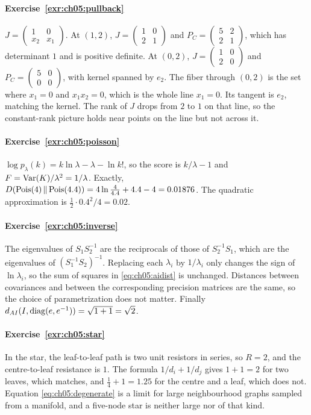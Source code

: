 \paragraph{Exercise~\ref{exr:ch05:pullback}}
$J=\begin{pmatrix}1&0\\x_2&x_1\end{pmatrix}$. At $(1,2)$, $J=\begin{pmatrix}1&0\\2&1\end{pmatrix}$ and $P_C=\begin{pmatrix}5&2\\2&1\end{pmatrix}$, which has determinant $1$ and is positive definite. At $(0,2)$, $J=\begin{pmatrix}1&0\\2&0\end{pmatrix}$ and $P_C=\begin{pmatrix}5&0\\0&0\end{pmatrix}$, with kernel spanned by $e_2$. The fiber through $(0,2)$ is the set where $x_1=0$ and $x_1x_2=0$, which is the whole line $x_1=0$. Its tangent is $e_2$, matching the kernel. The rank of $J$ drops from $2$ to $1$ on that line, so the constant-rank picture holds near points on the line but not across it.

\paragraph{Exercise~\ref{exr:ch05:poisson}}
$\log p_\lambda(k)=k\ln\lambda-\lambda-\ln k!$, so the score is $k/\lambda-1$ and $F=\operatorname{Var}(K)/\lambda^2=1/\lambda$. Exactly, $D\!\left(\mathrm{Pois}(4)\,\middle\|\,\mathrm{Pois}(4.4)\right)=4\ln\frac{4}{4.4}+4.4-4=0.01876$. The quadratic approximation is $\tfrac12\cdot0.4^2/4=0.02$.

\paragraph{Exercise~\ref{exr:ch05:inverse}}
The eigenvalues of $S_1S_2^{-1}$ are the reciprocals of those of $S_2^{-1}S_1$, which are the eigenvalues of $(S_1^{-1}S_2)^{-1}$. Replacing each $\lambda_i$ by $1/\lambda_i$ only changes the sign of $\ln\lambda_i$, so the sum of squares in \eqref{eq:ch05:aidist} is unchanged. Distances between covariances and between the corresponding precision matrices are the same, so the choice of parametrization does not matter. Finally $d_{AI}(I,\operatorname{diag}(e,e^{-1}))=\sqrt{1+1}=\sqrt2$.

\paragraph{Exercise~\ref{exr:ch05:star}}
In the star, the leaf-to-leaf path is two unit resistors in series, so $R=2$, and the centre-to-leaf resistance is $1$. The formula $1/d_i+1/d_j$ gives $1+1=2$ for two leaves, which matches, and $\tfrac14+1=1.25$ for the centre and a leaf, which does not. Equation \eqref{eq:ch05:degenerate} is a limit for large neighbourhood graphs sampled from a manifold, and a five-node star is neither large nor of that kind.
